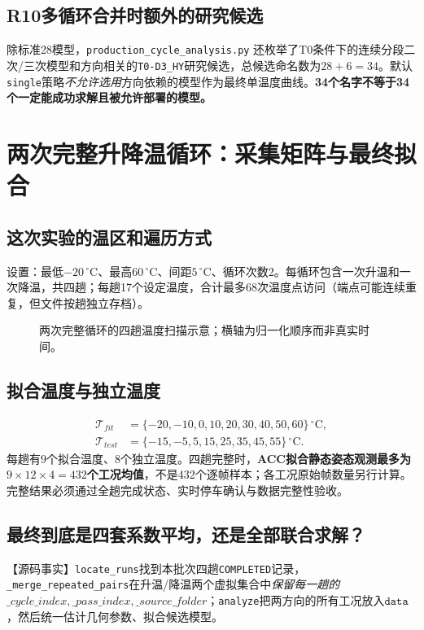 \documentclass[UTF8,a4paper,11pt,oneside,openany,fontset=none]{ctexbook}
\newcommand{\degc}{\,^{\circ}\mathrm C}
\begin{document}
\section{R10多循环合并时额外的研究候选}
除标准28模型，\texttt{production\_cycle\_analysis.py} 还枚举了T0条件下的连续分段二次/三次模型和方向相关的\texttt{T0-D3\_HY}研究候选，总候选命名数为$28+6=34$。默认\texttt{single}策略\emph{不允许选用}方向依赖的模型作为最终单温度曲线。\textbf{34个名字不等于34个一定能成功求解且被允许部署的模型。}

\chapter{两次完整升降温循环：采集矩阵与最终拟合}
\section{这次实验的温区和遍历方式}
设置：最低$-20\degc$、最高$60\degc$、间距$5\degc$、循环次数2。每循环包含一次升温和一次降温，共四趟；每趟17个设定温度，合计最多68次温度点访问（端点可能连续重复，但文件按趟独立存档）。
\begin{figure}[htbp]\centering\caption{两次完整循环的四趟温度扫描示意；横轴为归一化顺序而非真实时间。}\end{figure}

\section{拟合温度与独立温度}
\begin{align}
\mathcal T_{fit}&=\{-20,-10,0,10,20,30,40,50,60\}\degc,\\
\mathcal T_{test}&=\{-15,-5,5,15,25,35,45,55\}\degc.
\end{align}
每趟有9个拟合温度、8个独立温度。四趟完整时，\textbf{ACC拟合静态姿态观测最多为$9\times12\times4=432$个工况均值}，不是432个逐帧样本；各工况原始帧数量另行计算。完整结果必须通过全趟完成状态、实时停车确认与数据完整性验收。

\section{最终到底是四套系数平均，还是全部联合求解？}
【源码事实】\texttt{locate\_runs}找到本批次四趟\texttt{COMPLETED}记录，\texttt{\_merge\_repeated\_pairs}在升温/降温两个虚拟集合中\emph{保留每一趟的$\_cycle\_index,\_pass\_index,\_source\_folder$}；\texttt{analyze}把两方向的所有工况放入$\texttt{data}$，然后统一估计几何参数、拟合候选模型。
\end{document}
